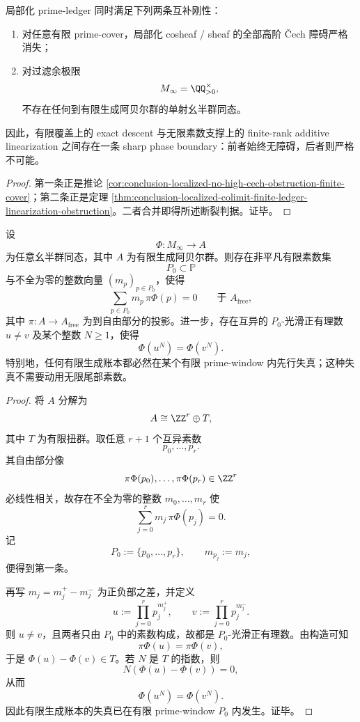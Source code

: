 \begin{corollary}\label{cor:conclusion-localized-finite-descent-vs-infinite-ledger-sharp-break}
局部化 prime-ledger 同时满足下列两条互补刚性：
\begin{enumerate}
\normalfont
  \item 对任意有限 prime-cover，局部化 cosheaf / sheaf 的全部高阶 \v Cech 障碍严格消失；
  \item 对过滤余极限
  \[
  M_\infty=\QQ_{>0}^{\times},
  \]
  不存在任何到有限生成阿贝尔群的单射幺半群同态。
\end{enumerate}
因此，有限覆盖上的 exact descent 与无限素数支撑上的 finite-rank additive linearization 之间存在一条 sharp phase boundary：前者始终无障碍，后者则严格不可能。
\end{corollary}
\begin{proof}
第一条正是推论 \ref{cor:conclusion-localized-no-high-cech-obstruction-finite-cover}；第二条正是定理 \ref{thm:conclusion-localized-colimit-finite-ledger-linearization-obstruction}。二者合并即得所述断裂判据。证毕。
\end{proof}

\begin{corollary}\label{cor:conclusion-localized-finite-ledger-prime-window-truncation}
设
\[
\Phi:M_\infty\to A
\]
为任意幺半群同态，其中 \(A\) 为有限生成阿贝尔群。则存在非平凡有限素数集
\[
P_0\subset \mathbb P
\]
与不全为零的整数向量 \((m_p)_{p\in P_0}\)，使得
\[
\sum_{p\in P_0}m_p\,\pi\Phi(p)=0
\qquad\text{于 }A_{\mathrm{free}},
\]
其中 \(\pi:A\to A_{\mathrm{free}}\) 为到自由部分的投影。进一步，存在互异的 \(P_0\)-光滑正有理数 \(u\neq v\) 及某个整数 \(N\ge 1\)，使得
\[
\Phi(u^N)=\Phi(v^N).
\]
特别地，任何有限生成账本都必然在某个有限 prime-window 内先行失真；这种失真不需要动用无限尾部素数。
\end{corollary}
\begin{proof}
将 \(A\) 分解为
\[
A\cong \ZZ^r\oplus T,
\]
其中 \(T\) 为有限扭群。取任意 \(r+1\) 个互异素数
\[
p_0,\dots,p_r.
\]
其自由部分像
\[
\pi\Phi(p_0),\dots,\pi\Phi(p_r)\in \ZZ^r
\]
必线性相关，故存在不全为零的整数 \(m_0,\dots,m_r\) 使
\[
\sum_{j=0}^r m_j\,\pi\Phi(p_j)=0.
\]
记
\[
P_0:=\{p_0,\dots,p_r\},
\qquad
m_{p_j}:=m_j,
\]
便得到第一条。

再写 \(m_j=m_j^+-m_j^-\) 为正负部之差，并定义
\[
u:=\prod_{j=0}^r p_j^{m_j^+},
\qquad
v:=\prod_{j=0}^r p_j^{m_j^-}.
\]
则 \(u\neq v\)，且两者只由 \(P_0\) 中的素数构成，故都是 \(P_0\)-光滑正有理数。由构造可知
\[
\pi\Phi(u)=\pi\Phi(v),
\]
于是 \(\Phi(u)-\Phi(v)\in T\)。若 \(N\) 是 \(T\) 的指数，则
\[
N(\Phi(u)-\Phi(v))=0,
\]
从而
\[
\Phi(u^N)=\Phi(v^N).
\]
因此有限生成账本的失真已在有限 prime-window \(P_0\) 内发生。证毕。
\end{proof}
